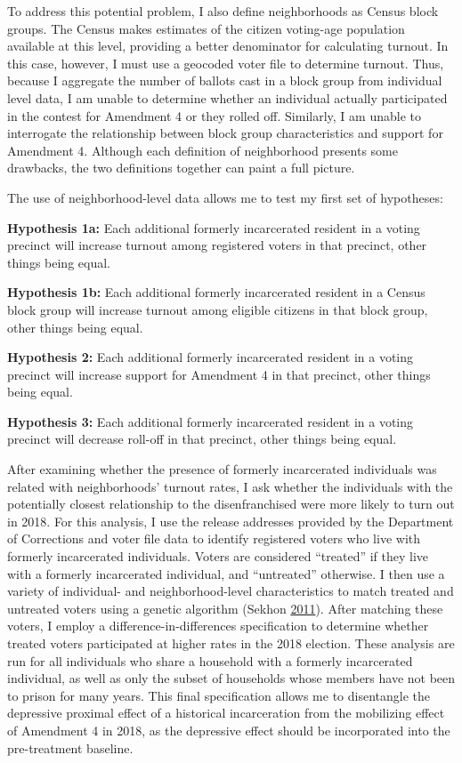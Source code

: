 \documentclass[
  12pt,
]{article}
\begin{document}
To address this potential problem, I also define neighborhoods as Census block groups. The Census makes estimates of the citizen voting-age population available at this level, providing a better denominator for calculating turnout. In this case, however, I must use a geocoded voter file to determine turnout. Thus, because I aggregate the number of ballots cast in a block group from individual level data, I am unable to determine whether an individual actually participated in the contest for Amendment 4 or they rolled off. Similarly, I am unable to interrogate the relationship between block group characteristics and support for Amendment 4. Although each definition of neighborhood presents some drawbacks, the two definitions together can paint a full picture.

The use of neighborhood-level data allows me to test my first set of hypotheses:

\textbf{Hypothesis 1a:} Each additional formerly incarcerated resident in a voting precinct will increase turnout among registered voters in that precinct, other things being equal.

\textbf{Hypothesis 1b:} Each additional formerly incarcerated resident in a Census block group will increase turnout among eligible citizens in that block group, other things being equal.

\textbf{Hypothesis 2:} Each additional formerly incarcerated resident in a voting precinct will increase support for Amendment 4 in that precinct, other things being equal.

\textbf{Hypothesis 3:} Each additional formerly incarcerated resident in a voting precinct will decrease roll-off in that precinct, other things being equal.

After examining whether the presence of formerly incarcerated individuals was related with neighborhoods' turnout rates, I ask whether the individuals with the potentially closest relationship to the disenfranchised were more likely to turn out in 2018. For this analysis, I use the release addresses provided by the Department of Corrections and voter file data to identify registered voters who live with formerly incarcerated individuals. Voters are considered ``treated'' if they live with a formerly incarcerated individual, and ``untreated'' otherwise. I then use a variety of individual- and neighborhood-level characteristics to match treated and untreated voters using a genetic algorithm (Sekhon \protect\hyperlink{ref-Sekhon2011}{2011}). After matching these voters, I employ a difference-in-differences specification to determine whether treated voters participated at higher rates in the 2018 election. These analysis are run for all individuals who share a household with a formerly incarcerated individual, as well as only the subset of households whose members have not been to prison for many years. This final specification allows me to disentangle the depressive proximal effect of a historical incarceration from the mobilizing effect of Amendment 4 in 2018, as the depressive effect should be incorporated into the pre-treatment baseline.
\end{document}

